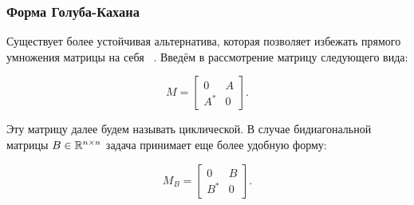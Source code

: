 \subsubsection{Форма Голуба-Кахана}

Существует более устойчивая альтернатива, которая позволяет избежать прямого умножения матрицы на себя ~\cite{mr3_algo4triagonal_sym_eigen_and_bidiagSVD}. Введём в рассмотрение матрицу следующего вида:

\begin{equation}
M = \begin{bmatrix} 0 & A \\ A^* & 0 \end{bmatrix}.
\end{equation}

Эту матрицу далее будем называть циклической. В случае бидиагональной матрицы \( B \in \mathbb{R}^{n \times n} \) задача принимает еще более удобную форму:

\begin{equation}
M_B = \begin{bmatrix} 0 & B \\ B^* & 0 \end{bmatrix}.
\end{equation}






